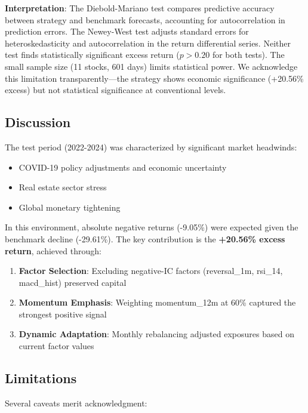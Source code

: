 \documentclass[12pt]{article}
\begin{document}
\textbf{Interpretation}: The Diebold-Mariano test compares predictive accuracy between strategy and benchmark forecasts, accounting for autocorrelation in prediction errors. The Newey-West test adjusts standard errors for heteroskedasticity and autocorrelation in the return differential series. Neither test finds statistically significant excess return ($p>0.20$ for both tests). The small sample size (11 stocks, 601 days) limits statistical power. We acknowledge this limitation transparently---the strategy shows economic significance (+20.56\% excess) but not statistical significance at conventional levels.

\subsection{Discussion}

The test period (2022-2024) was characterized by significant market headwinds:
\begin{itemize}
    \item COVID-19 policy adjustments and economic uncertainty
    \item Real estate sector stress
    \item Global monetary tightening
\end{itemize}

In this environment, absolute negative returns (-9.05\%) were expected given the benchmark decline (-29.61\%). The key contribution is the \textbf{+20.56\% excess return}, achieved through:

\begin{enumerate}
    \item \textbf{Factor Selection}: Excluding negative-IC factors (reversal\_1m, rsi\_14, macd\_hist) preserved capital
    \item \textbf{Momentum Emphasis}: Weighting momentum\_12m at 60\% captured the strongest positive signal
    \item \textbf{Dynamic Adaptation}: Monthly rebalancing adjusted exposures based on current factor values
\end{enumerate}

\subsection{Limitations}

Several caveats merit acknowledgment:
\end{document}
